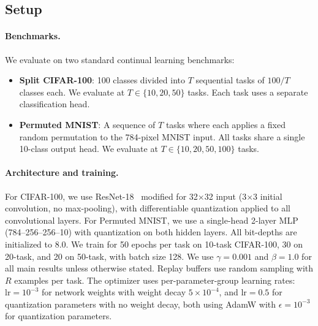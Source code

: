 \documentclass[11pt]{article}
\begin{document}
\subsection{Setup}

\paragraph{Benchmarks.}
We evaluate on two standard continual learning benchmarks:
\begin{itemize}
    \item \textbf{Split CIFAR-100}: 100 classes divided into $T$ sequential tasks of $100/T$ classes each. We evaluate at $T \in \{10, 20, 50\}$ tasks. Each task uses a separate classification head.
    \item \textbf{Permuted MNIST}: A sequence of $T$ tasks where each applies a fixed random permutation to the 784-pixel MNIST input. All tasks share a single 10-class output head. We evaluate at $T \in \{10, 20, 50, 100\}$ tasks.
\end{itemize}

\paragraph{Architecture and training.}
For CIFAR-100, we use ResNet-18~\citep{he2016deep} modified for 32$\times$32 input (3$\times$3 initial convolution, no max-pooling), with differentiable quantization applied to all convolutional layers.
For Permuted MNIST, we use a single-head 2-layer MLP (784--256--256--10) with quantization on both hidden layers.
All bit-depths are initialized to 8.0.
We train for 50 epochs per task on 10-task CIFAR-100, 30 on 20-task, and 20 on 50-task, with batch size 128.
We use $\gamma = 0.001$ and $\beta = 1.0$ for all main results unless otherwise stated.
Replay buffers use random sampling with $R$ examples per task.
The optimizer uses per-parameter-group learning rates: $\text{lr}=10^{-3}$ for network weights with weight decay $5 \times 10^{-4}$, and $\text{lr}=0.5$ for quantization parameters with no weight decay, both using AdamW with $\epsilon = 10^{-3}$ for quantization parameters.
\end{document}
